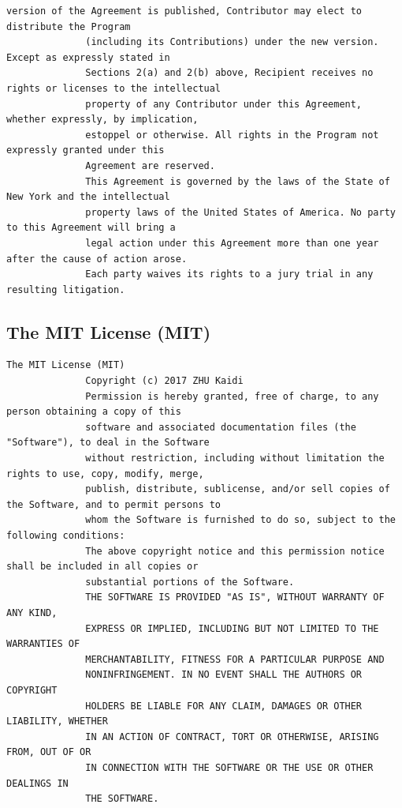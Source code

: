 \begin{lstlisting}[basicstyle=\ttfamily\scriptsize,breaklines=true]
              version of the Agreement is published, Contributor may elect to distribute the Program
              (including its Contributions) under the new version. Except as expressly stated in
              Sections 2(a) and 2(b) above, Recipient receives no rights or licenses to the intellectual
              property of any Contributor under this Agreement, whether expressly, by implication,
              estoppel or otherwise. All rights in the Program not expressly granted under this
              Agreement are reserved.
              This Agreement is governed by the laws of the State of New York and the intellectual
              property laws of the United States of America. No party to this Agreement will bring a
              legal action under this Agreement more than one year after the cause of action arose.
              Each party waives its rights to a jury trial in any resulting litigation.
\end{lstlisting}

\subsection{The MIT License (MIT)}

\begin{lstlisting}[basicstyle=\ttfamily\scriptsize,breaklines=true]
The MIT License (MIT)
              Copyright (c) 2017 ZHU Kaidi
              Permission is hereby granted, free of charge, to any person obtaining a copy of this
              software and associated documentation files (the "Software"), to deal in the Software
              without restriction, including without limitation the rights to use, copy, modify, merge,
              publish, distribute, sublicense, and/or sell copies of the Software, and to permit persons to
              whom the Software is furnished to do so, subject to the following conditions:
              The above copyright notice and this permission notice shall be included in all copies or
              substantial portions of the Software.
              THE SOFTWARE IS PROVIDED "AS IS", WITHOUT WARRANTY OF ANY KIND,
              EXPRESS OR IMPLIED, INCLUDING BUT NOT LIMITED TO THE WARRANTIES OF
              MERCHANTABILITY, FITNESS FOR A PARTICULAR PURPOSE AND
              NONINFRINGEMENT. IN NO EVENT SHALL THE AUTHORS OR COPYRIGHT
              HOLDERS BE LIABLE FOR ANY CLAIM, DAMAGES OR OTHER LIABILITY, WHETHER
              IN AN ACTION OF CONTRACT, TORT OR OTHERWISE, ARISING FROM, OUT OF OR
              IN CONNECTION WITH THE SOFTWARE OR THE USE OR OTHER DEALINGS IN
              THE SOFTWARE.
\end{lstlisting}

